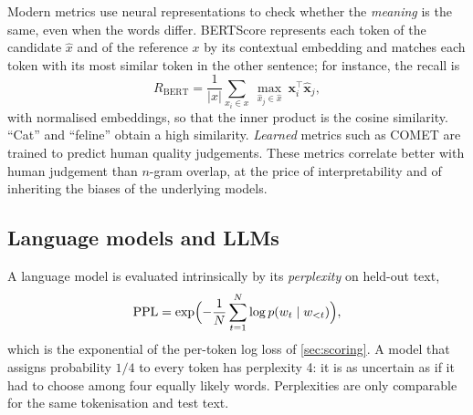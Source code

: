 Modern metrics use neural representations to check whether the \emph{meaning} is the same, even
when the words differ. BERTScore \citep{zhang2020bertscore} represents each token of the
candidate $\hat x$ and of the reference $x$ by its contextual embedding and matches each token
with its most similar token in the other sentence; for instance, the recall is
\begin{equation}
  R_{\text{BERT}}=\frac{1}{|x|}\sum_{x_i\in x}\ \max_{\hat x_j\in\hat x}\ \mathbf x_i^{\top}\hat{\mathbf x}_j,
\end{equation}
with normalised embeddings, so that the inner product is the cosine similarity. ``Cat'' and
``feline'' obtain a high similarity. \emph{Learned} metrics such as COMET \citep{rei2020comet} are trained to predict human quality judgements. These metrics correlate better with
human judgement than $n$-gram overlap, at the price of interpretability and of inheriting the
biases of the underlying models.

\subsection{Language models and LLMs}

A language model is evaluated intrinsically by its \emph{perplexity} on held-out text,
\begin{equation}
  \mathrm{PPL}=\exp\Bigl(-\frac1N\sum_{t=1}^{N}\log p(w_t\mid w_{<t})\Bigr),
\end{equation}
which is the exponential of the per-token log loss of \cref{sec:scoring}. A model that assigns
probability $1/4$ to every token has perplexity 4: it is as uncertain as if it had to choose
among four equally likely words. Perplexities are only comparable for the same tokenisation and
test text.

